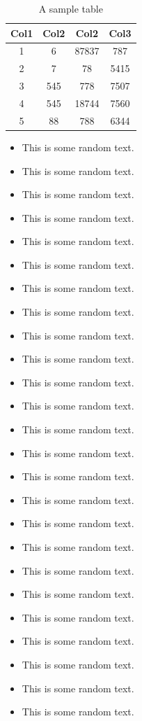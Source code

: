 \begin{table}[h]
	\caption{A sample table}
	\centering
	\begin{tabular}{||c c c c||} 
		\hline
		Col1 & Col2 & Col2 & Col3 \\ [0.5ex] 
		\hline\hline
		1 & 6 & 87837 & 787 \\ 
		2 & 7 & 78 & 5415 \\
		3 & 545 & 778 & 7507 \\
		4 & 545 & 18744 & 7560 \\
		5 & 88 & 788 & 6344 \\ [1ex] 
		\hline
	\end{tabular}
\end{table}

\begin{itemize}
	\item This is some random text.
	\item This is some random text.
	\item This is some random text.
	\item This is some random text.
	\item This is some random text.
	\item This is some random text.
	\item This is some random text.
	\item This is some random text.
	\item This is some random text.
	\item This is some random text.
	\item This is some random text.
	\item This is some random text.
	\item This is some random text.
	\item This is some random text.
	\item This is some random text.
	\item This is some random text.
	\item This is some random text.
	\item This is some random text.
	\item This is some random text.
	\item This is some random text.
	\item This is some random text.
	\item This is some random text.
	\item This is some random text.
	\item This is some random text.
		\item This is some random text.

\end{itemize}
